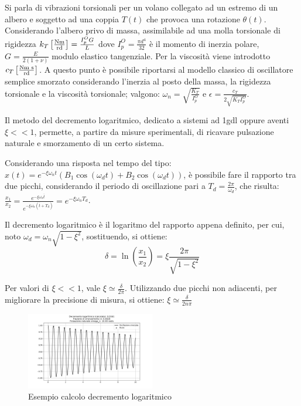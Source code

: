 Si parla di vibrazioni torsionali per un volano collegato ad un estremo di un albero e soggetto ad una coppia \(T(t)\) che provoca una rotazione \(\theta(t)\).
Considerando l'albero privo di massa, assimilabile ad una molla torsionale di rigidezza \(k_T \left[\frac{\text{Nm}}{\text{rd}}\right] = \frac{I_p^O G}{L}\) dove \(I_p^O = \frac{\pi d^4}{32}\) è il momento di inerzia polare, \(G = \frac{E}{2(1+\nu)}\) modulo elastico tangenziale.
Per la viscosità viene introdotto \(c_T \left[\frac{\text{Nm s}}{\text{rd}}\right]\).
A questo punto è possibile riportarsi al modello classico di oscillatore semplice smorzato considerando l'inerzia al posto della massa, la rigidezza torsionale e la viscosità torsionale; valgono: \(\omega_n=\sqrt{\frac{K_T}{I^O_p}}\) e \(\epsilon = \frac{c_T}{2\sqrt{K_T I^O_p}}\).

\label{decr_log}
Il metodo del decremento logaritmico, dedicato a sistemi ad 1gdl oppure aventi \(\xi << 1\), permette, a partire da misure sperimentali, di ricavare pulsazione naturale e smorzamento di un certo sistema.

Considerando una risposta nel tempo del tipo: \(x(t) = e^{-\xi\omega_n t} (B_1 \cos{(\omega_d t)} + B_2 \cos{(\omega_d t)}) \), è possibile fare il rapporto tra due picchi, considerando il periodo di oscillazione pari a \(T_d = \frac{2\pi}{\omega_d}\), che risulta: \(\frac{x_1}{x_2} = \frac{e^{-\xi\omega_n \overline{t}}}{e^{-\xi\omega_n (\overline{t}+T_d)}} = e^{-\xi\omega_n T_d}\).

Il decremento logaritmico è il logaritmo del rapporto appena definito, per cui, noto \(\omega_d = \omega_n\sqrt{1-\xi^2}\), sostituendo, si ottiene:
\[
\delta = \ln{\left(\frac{x_1}{x_2}\right)} =  \xi\frac{2\pi}{\sqrt{1-\xi^2}}
\]

Per valori di \(\xi << 1\), vale \(\xi \simeq \frac{\delta}{2\pi}\).
Utilizzando due picchi non adiacenti, per migliorare la precisione di misura, si ottiene: \(\xi \simeq \frac{\delta}{2 n \pi}\)

\begin{figure}[h]
    \centering
    \includegraphics[width=0.5\textwidth]{Immagini/es_decremento_log.png}
    \caption{Esempio calcolo decremento logaritmico}
\end{figure}

